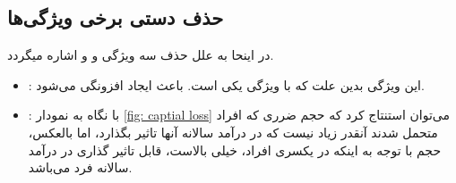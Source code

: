 \documentclass{article}
\begin{document}
\subsection{حذف دستی برخی ویژگی‌ها}
در اینحا به علل حذف سه ویژگی 
و
و
اشاره میگردد.
\begin{itemize}
	\item {}:
	 این ویژگی بدین علت که با ویژگی
	 یکی است. باعث ایجاد افزونگی می‌شود.
	\item {}:
	با نگاه به نمودار 
	\ref{fig: captial loss}
	می‌توان استنتاج کرد که حجم ضرری که افراد متحمل شدند آنقدر زیاد نیست که در درآمد سالانه آنها تاثیر بگذارد، اما بالعکس، حجم  با توجه به اینکه در یکسری افراد، خیلی بالاست، قابل تاثیر گذاری در درآمد سالانه فرد می‌باشد.
\end{itemize}
	
\end{document}
